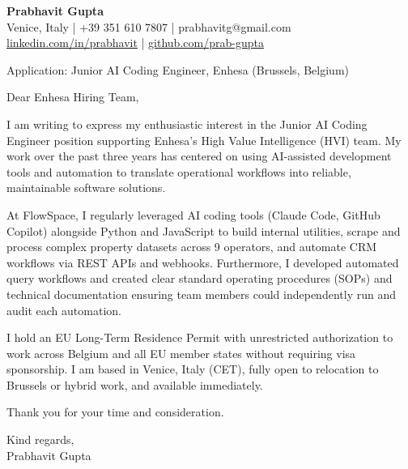 \documentclass[a4paper,11pt]{article}
\begin{document}
\textbf{Prabhavit Gupta}\\
Venice, Italy | +39 351 610 7807 | prabhavitg@gmail.com\\
\href{https://www.linkedin.com/in/prabhavit/}{linkedin.com/in/prabhavit} | \href{https://github.com/prab-gupta}{github.com/prab-gupta}

Application: Junior AI Coding Engineer, Enhesa (Brussels, Belgium)

Dear Enhesa Hiring Team,

I am writing to express my enthusiastic interest in the Junior AI Coding Engineer position supporting Enhesa's High Value Intelligence (HVI) team. My work over the past three years has centered on using AI-assisted development tools and automation to translate operational workflows into reliable, maintainable software solutions.

At FlowSpace, I regularly leveraged AI coding tools (Claude Code, GitHub Copilot) alongside Python and JavaScript to build internal utilities, scrape and process complex property datasets across 9 operators, and automate CRM workflows via REST APIs and webhooks. Furthermore, I developed automated query workflows and created clear standard operating procedures (SOPs) and technical documentation ensuring team members could independently run and audit each automation.

I hold an EU Long-Term Residence Permit with unrestricted authorization to work across Belgium and all EU member states without requiring visa sponsorship. I am based in Venice, Italy (CET), fully open to relocation to Brussels or hybrid work, and available immediately.

Thank you for your time and consideration.

Kind regards,\\
Prabhavit Gupta
\end{document}
